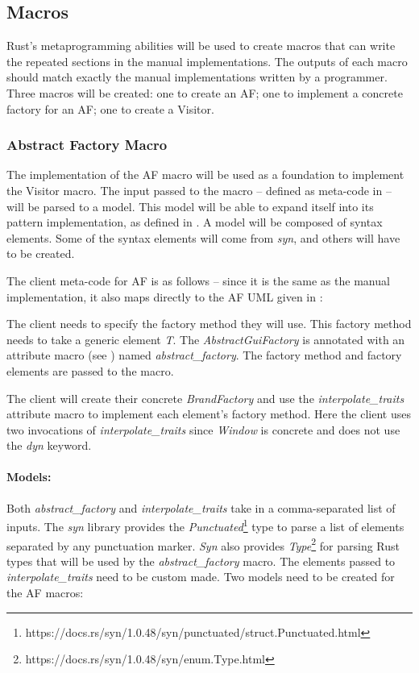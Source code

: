 \subsection{Macros}
Rust's metaprogramming abilities will be used to create macros that can write the repeated sections in the manual implementations.
The outputs of each macro should match exactly the manual implementations written by a programmer.
Three macros will be created: one to create an AF; one to implement a concrete factory for an AF; one to create a Visitor.

\subsubsection{Abstract Factory Macro}
The implementation of the AF macro will be used as a foundation to implement the Visitor macro.
The input passed to the macro -- defined as meta-code in  -- will be parsed to a model.
This model will be able to expand itself into its pattern implementation, as defined in .
A model will be composed of syntax elements.
Some of the syntax elements will come from \textit{syn}, and others will have to be created.

The client meta-code for AF is as follows -- since it is the same as the manual implementation, it also maps directly to the AF UML given in :


The client needs to specify the factory method they will use.
This factory method needs to take a generic element \textit{T}.
The \textit{AbstractGuiFactory} is annotated with an attribute macro (see ) named \textit{abstract\_factory}.
The factory method and factory elements are passed to the macro.

The client will create their concrete \textit{BrandFactory} and use the \textit{interpolate\_traits} attribute macro to implement each element's factory method.
Here the client uses two invocations of \textit{interpolate\_traits} since \textit{Window} is concrete and does not use the \textit{dyn} keyword.

\paragraph{Models:}
Both \textit{abstract\_factory} and \textit{interpolate\_traits} take in a comma-separated list of inputs.
The \textit{syn} library provides the \textit{Punctuated}\footnote{https://docs.rs/syn/1.0.48/syn/punctuated/struct.Punctuated.html} type to parse a list of elements separated by any punctuation marker.
\textit{Syn} also provides \textit{Type}\footnote{https://docs.rs/syn/1.0.48/syn/enum.Type.html} for parsing Rust types that will be used by the \textit{abstract\_factory} macro.
The elements passed to \textit{interpolate\_traits} need to be custom made.
Two models need to be created for the AF macros:

